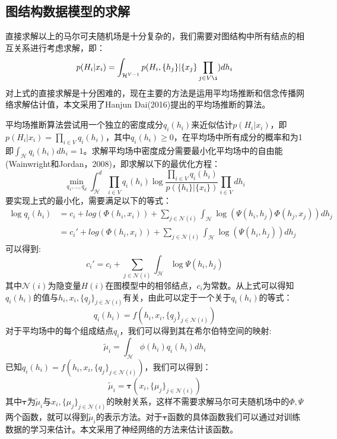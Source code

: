 \subsection{图结构数据模型的求解}
直接求解以上的马尔可夫随机场是十分复杂的，我们需要对图结构中所有结点的相互关系进行考虑求解，即：
\begin{equation*}
p(H_i|{x_i}) = \int_{\mathcal{H}^{V-1}} p(H_i, \{h_j\}| \{x_j\}\prod_{j\in V\i})dh_i
\end{equation*}
对上式的直接求解是十分困难的，现在主要的方法是运用平均场推断和信念传播网络求解估计值，本文采用了Hanjun Dai(2016)提出的平均场推断的算法。
\par 平均场推断算法尝试用一个独立的密度成分$q_i(h_i)$来近似估计$p(H_i|{x_i})$，即$p(H_i|{x_i})=\prod_{i\in V} q_i(h_i)$，其中$q_i(h_i)\ge 0$，在平均场中所有成分的概率和为1即$\int_\mathcal{H} q_i(h_i)dh_i=1$。求解平均场中密度成分需要最小化平均场中的自由能(Wainwright和Jordan，2008)，即求解以下的最优化方程：
\begin{equation*}
\min_{q_1, ..., q_d} \int_\mathcal{H}^d \prod_{i\in V}q_i(h_i)\log \frac{\prod_{i\in V}q_i(h_i)}{p(\{h_i\}|\{x_i\})}\prod_{i\in V}dh_i
\end{equation*}
要实现上式的最小化，需要满足以下的等式：
\begin{align*}
\log q_i(h_i) &= c_i + log( \Phi(h_i, x_i)) + \sum_{j\in \mathcal{N}(i)} \int_\mathcal{H}\log (\Psi(h_i, h_j) \Phi(h_j, x_j))dh_j\\
&={c_i}'+ log( \Phi(h_i, x_i)) + \sum_{j\in \mathcal{N}(i)} \int_\mathcal{H}\log (\Psi(h_i, h_j))dh_j
\end{align*}
可以得到:
$$c_i' = c_i + \sum_{j\in \mathcal{N}(i)} \int_\mathcal{H}\log \Psi(h_i, h_j)  $$
其中$\mathcal{N}(i)$为隐变量$H(i)$在图模型中的相邻结点，$c_i$为常数。从上式可以得知$q_i(h_i)$的值与$h_i, x_i, \{q_j\}_{j\in \mathcal{N}(i)}$有关，由此可以定于一个关于$q_i(h_i)$的等式：
\begin{equation*}
q_i(h_i) =  f(h_i, x_i,  \{q_j\}_{j\in \mathcal{N}(i)})
\end{equation*}
对于平均场中的每个组成结点$q_i$，我们可以得到其在希尔伯特空间的映射:
\begin{equation*}
\tilde{\mu}_i = \int_{\mathcal{H}} \phi(h_i)q_i(h_i)dh_i
\end{equation*}
已知$q_i(h_i) =  f(h_i, x_i,  \{q_j\}_{j\in \mathcal{N}(i)})$，我们可以得到：
\begin{equation*}
\tilde{\mu}_i = \boldsymbol{\tau} (x_i, \{\mu_j\}_{j\in \mathcal{N}(i)})
\end{equation*}
其中$\boldsymbol{\tau}$为$\tilde{\mu}_i$与$x_i, \{\mu_j\}_{j\in \mathcal{N}(i)}$的映射关系，这样不需要求解马尔可夫随机场中的$\Phi, \Psi$两个函数，就可以得到$\tilde{\mu}_i$的表示方法。对于$\boldsymbol{\tau}$函数的具体函数我们可以通过对训练数据的学习来估计。本文采用了神经网络的方法来估计该函数。
